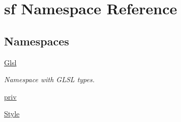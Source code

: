 \hypertarget{namespacesf}{\section{sf Namespace Reference}
\label{namespacesf}
}
\subsection*{Namespaces}
\begin{DoxyCompactItemize}
\item 
\hyperlink{namespacesf_1_1_glsl}{Glsl}
\begin{DoxyCompactList}\small\item\em Namespace with G\-L\-S\-L types. \end{DoxyCompactList}\item 
\hyperlink{namespacesf_1_1priv}{priv}
\item 
\hyperlink{namespacesf_1_1_style}{Style}
\end{DoxyCompactItemize}
